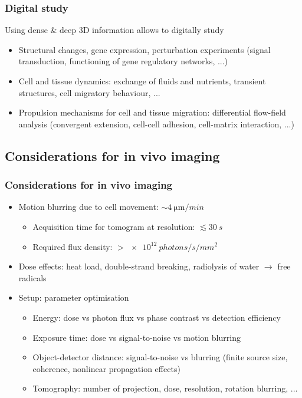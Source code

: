 \documentclass{beamer}
\begin{document}
\begin{frame}
  \frametitle{Digital study}
  Using dense \& deep 3D information allows to digitally study
  \begin{itemize}
  \item Structural changes, gene expression, perturbation experiments 
    (signal transduction, functioning of gene regulatory networks, ...)
  \item Cell and tissue dynamics: exchange of fluids and nutrients,
    transient structures, cell migratory behaviour, ...
  \item Propulsion mechanisms for cell and tissue migration:
    differential flow-field analysis (convergent extension, cell-cell
    adhesion, cell-matrix interaction, ...)
  \end{itemize}
\end{frame}

\subsection{Considerations for in vivo imaging}

\begin{frame}
  \frametitle{Considerations for in vivo imaging}
  \begin{itemize}
  \item Motion blurring due to cell movement: $\sim \SI{4}{\micro\metre/min}$
    \begin{itemize}
    \item Acquisition time for tomogram at  resolution: $\lesssim \SI{30}{s}$
    \item Required flux density: $> \SI{e12}{photons/s/mm^2}$
    \end{itemize}

  \item Dose effects: heat load, double-strand breaking, radiolysis of
    water $\rightarrow$ free radicals
  \item Setup: parameter optimisation
    \begin{itemize}
    \item Energy: dose vs photon flux vs phase contrast vs detection efficiency
    \item Exposure time: dose vs signal-to-noise vs motion blurring
    \item Object-detector distance: signal-to-noise vs blurring
      (finite source size, coherence, nonlinear propagation effects)
    \item Tomography: number of projection, dose, resolution, rotation
      blurring, ...
    \end{itemize}
  \end{itemize}
\end{frame}
\end{document}
